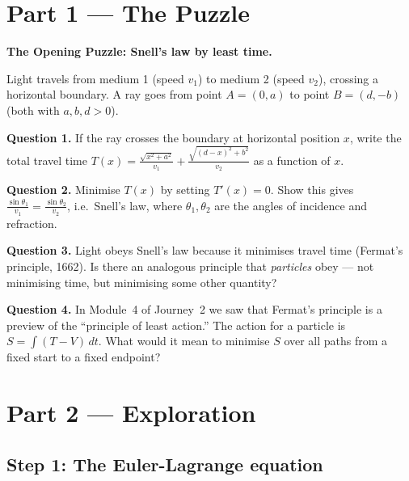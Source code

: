 \documentclass[12pt,a4paper]{article}
\begin{document}
\newpage

\section{Part 1 \texorpdfstring{---}{--} The Puzzle}

\begin{puzzlebox}
\textbf{The Opening Puzzle: Snell's law by least time.}

Light travels from medium 1 (speed $v_1$) to medium 2 (speed $v_2$), crossing a horizontal boundary. A ray goes from point $A = (0, a)$ to point $B = (d, -b)$ (both with $a,b,d>0$).

\medskip
\textbf{Question 1.} If the ray crosses the boundary at horizontal position $x$, write the total travel time $T(x) = \frac{\sqrt{x^2+a^2}}{v_1}+\frac{\sqrt{(d-x)^2+b^2}}{v_2}$ as a function of $x$.

\textbf{Question 2.} Minimise $T(x)$ by setting $T'(x)=0$. Show this gives $\frac{\sin\theta_1}{v_1}=\frac{\sin\theta_2}{v_2}$, i.e.\ Snell's law, where $\theta_1,\theta_2$ are the angles of incidence and refraction.

\textbf{Question 3.} Light obeys Snell's law because it minimises travel time (Fermat's principle, 1662). Is there an analogous principle that \emph{particles} obey --- not minimising time, but minimising some other quantity?

\textbf{Question 4.} In Module~4 of Journey~2 we saw that Fermat's principle is a preview of the ``principle of least action.'' The action for a particle is $S = \int(T-V)\,dt$. What would it mean to minimise $S$ over all paths from a fixed start to a fixed endpoint?
\end{puzzlebox}

\section{Part 2 \texorpdfstring{---}{--} Exploration}

\subsection{Step 1: The Euler-Lagrange equation}
\end{document}
